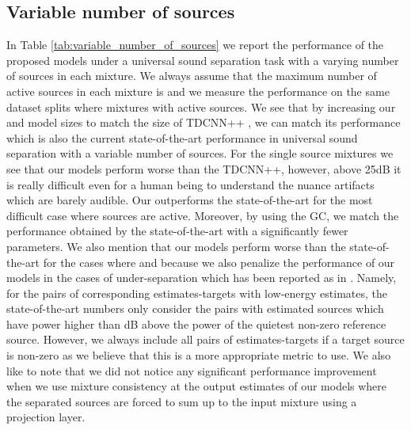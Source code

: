\subsection{Variable number of sources}
\label{sec:results:fuss}
In Table \ref{tab:variable_number_of_sources} we report the performance of the proposed \sudo models under a universal sound separation task with a varying number of sources in each mixture. We always assume that the maximum number of active sources in each mixture is  and we measure the performance on the same dataset splits where mixtures with  active sources. We see that by increasing our \sudo and \sudoi model sizes to match the size of TDCNN++ \cite{wisdom2020FUSS}, we can match its performance which is also the current state-of-the-art performance in universal sound separation with a variable number of sources. For the single source mixtures we see that our models perform worse than the TDCNN++, however, above 25dB it is really difficult even for a human being to understand the nuance artifacts which are barely audible. Our \sudoixl outperforms the state-of-the-art for the most difficult case where  sources are active. Moreover, by using the \sudoil GC, we match the performance obtained by the state-of-the-art with a significantly fewer parameters. We also mention that our models perform worse than the state-of-the-art for the cases where  and  because we also penalize the performance of our models in the cases of under-separation which has been reported as  in \cite{wisdom2020FUSS}. Namely, for the pairs of corresponding estimates-targets with low-energy estimates, the state-of-the-art numbers only consider the pairs with estimated sources which have power higher than  dB above the power of the quietest non-zero reference source. However, we always include all pairs of estimates-targets if a target source is non-zero as we believe that this is a more appropriate metric to use. We also like to note that we did not notice any significant performance improvement when we use mixture consistency \cite{wisdom2019differentiable} at the output estimates of our models where the separated sources are forced to sum up to the input mixture using a projection layer.

